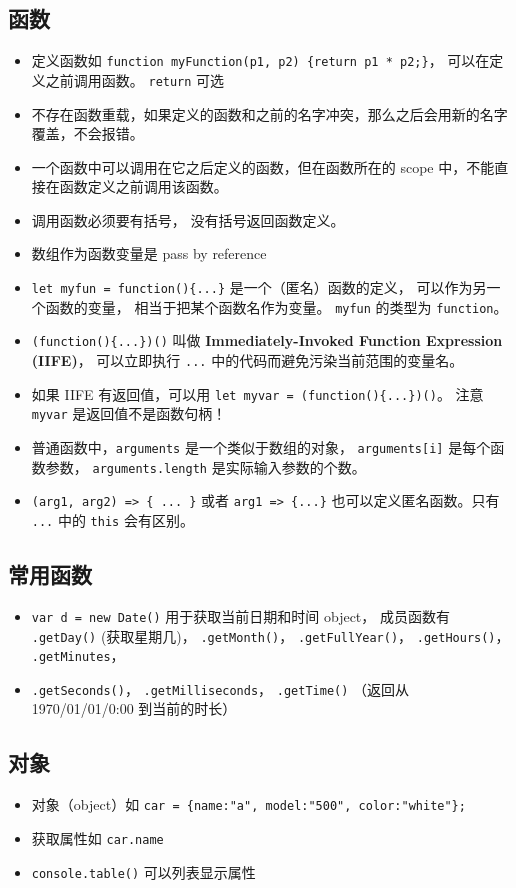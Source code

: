 \subsection{函数}
\begin{itemize}
\item 定义函数如 \verb|function myFunction(p1, p2) {return p1 * p2;}|， 可以在定义之前调用函数。 \verb|return| 可选
\item 不存在函数重载，如果定义的函数和之前的名字冲突，那么之后会用新的名字覆盖，不会报错。
\item 一个函数中可以调用在它之后定义的函数，但在函数所在的 scope 中，不能直接在函数定义之前调用该函数。
\item 调用函数必须要有括号， 没有括号返回函数定义。
\item 数组作为函数变量是 pass by reference
\item \verb|let myfun = function(){...}| 是一个（匿名）函数的定义， 可以作为另一个函数的变量， 相当于把某个函数名作为变量。 \verb`myfun` 的类型为 \verb|function|。
\item \verb|(function(){...})()| 叫做 \textbf{Immediately-Invoked Function Expression (IIFE)}， 可以立即执行 \verb|...| 中的代码而避免污染当前范围的变量名。
\item 如果 IIFE 有返回值，可以用 \verb`let myvar = (function(){...})()`。 注意 \verb`myvar` 是返回值不是函数句柄！
\item 普通函数中，\verb`arguments` 是一个类似于数组的对象， \verb`arguments[i]` 是每个函数参数， \verb`arguments.length` 是实际输入参数的个数。
\item \verb`(arg1, arg2) => { ... }` 或者 \verb`arg1 => {...}` 也可以定义匿名函数。只有 \verb`...` 中的 \verb`this` 会有区别。
\end{itemize}

\subsection{常用函数}
\begin{itemize}
\item \verb|var d = new Date()| 用于获取当前日期和时间 object， 成员函数有 \verb|.getDay()| (获取星期几)， \verb|.getMonth()|， \verb|.getFullYear()|， \verb|.getHours()|， \verb|.getMinutes|，
\item \verb|.getSeconds()|， \verb|.getMilliseconds|， \verb|.getTime()| （返回从 1970/01/01/0:00 到当前的时长）
\end{itemize}

\subsection{对象}
\begin{itemize}
\item 对象（object）如 \verb|car = {name:"a", model:"500", color:"white"};|
\item 获取属性如 \verb|car.name|
\item \verb|console.table()| 可以列表显示属性
\end{itemize}

